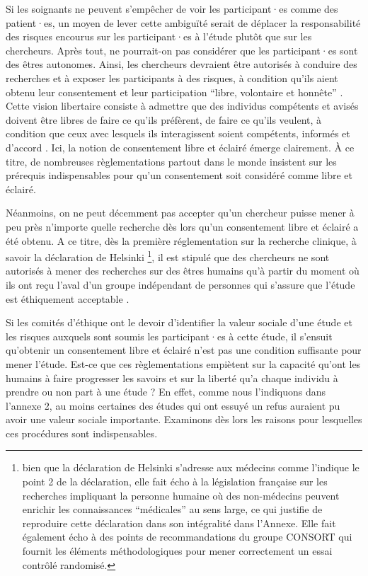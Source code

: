 \documentclass[
  12pt,
]{book}
\begin{document}
Si les soignants ne peuvent s'empêcher de voir les participant·es comme des patient·es, un moyen de lever cette ambiguïté serait de déplacer la responsabilité des risques encourus sur les participant·es à l'étude plutôt que sur les chercheurs. Après tout, ne pourrait-on pas considérer que les participant·es sont des êtres autonomes. Ainsi, les chercheurs devraient être autorisés à conduire des recherches et à exposer les participants à des risques, à condition qu'ils aient obtenu leur consentement et leur participation ``libre, volontaire et honnête'' \citep[page 11]{mill1989j}. Cette vision libertaire consiste à admettre que des individus compétents et avisés doivent être libres de faire ce qu'ils préfèrent, de faire ce qu'ils veulent, à condition que ceux avec lesquels ils interagissent soient compétents, informés et d'accord \citep{sep-clinical-research}. Ici, la notion de consentement libre et éclairé émerge clairement. À ce titre, de nombreuses règlementations partout dans le monde insistent sur les prérequis indispensables pour qu'un consentement soit considéré comme libre et éclairé.

Néanmoins, on ne peut décemment pas accepter qu'un chercheur puisse mener à peu près n'importe quelle recherche dès lors qu'un consentement libre et éclairé a été obtenu. A ce titre, dès la première réglementation sur la recherche clinique, à savoir la déclaration de Helsinki \citep{WMA1964}\footnote{bien que la déclaration de Helsinki s'adresse aux médecins comme l'indique le point 2 de la déclaration, elle fait écho à la législation française sur les recherches impliquant la personne humaine où des non-médecins peuvent enrichir les connaissances ``médicales'' au sens large, ce qui justifie de reproduire cette déclaration dans son intégralité dans l'Annexe. Elle fait également écho à des points de recommandations du groupe CONSORT qui fournit les éléments méthodologiques pour mener correctement un essai contrôlé randomisé.}, il est stipulé que des chercheurs ne sont autorisés à mener des recherches sur des êtres humains qu'à partir du moment où ils ont reçu l'aval d'un groupe indépendant de personnes qui s'assure que l'étude est éthiquement acceptable \citep{sep-clinical-research}.

Si les comités d'éthique ont le devoir d'identifier la valeur sociale d'une étude et les risques auxquels sont soumis les participant·es à cette étude, il s'ensuit qu'obtenir un consentement libre et éclairé n'est pas une condition suffisante pour mener l'étude. Est-ce que ces règlementations empiètent sur la capacité qu'ont les humains à faire progresser les savoirs et sur la liberté qu'a chaque individu à prendre ou non part à une étude ? En effet, comme nous l'indiquons dans l'annexe 2, au moins certaines des études qui ont essuyé un refus auraient pu avoir une valeur sociale importante. Examinons dès lors les raisons pour lesquelles ces procédures sont indispensables.
\end{document}
